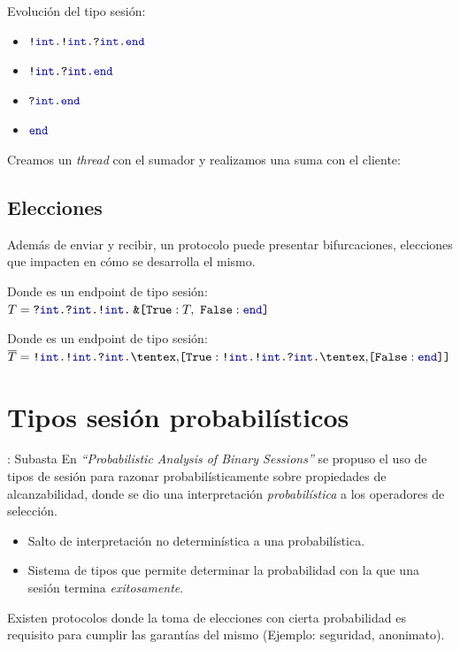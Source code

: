 \begin{frame}{\insertsubsection}
	\SumClient
	Evolución del tipo sesión:
	\begin{itemize}
		\item {} $\Out\tint{ \Out\tint{ \In\tint\End } }$
		\item {} $\Out\tint{ \In\tint\End }$
		\item {} $\In\tint\End$
		\item {} $\End$
	\end{itemize}
\end{frame}

\begin{frame}{\insertsubsection}
	\SumServer
	Creamos un \emph{thread} con el sumador y realizamos una suma con el cliente:
	\SumExample
\end{frame}

\subsection{Elecciones}

\begin{frame}{\insertsubsection}
	Además de enviar y recibir, un protocolo puede presentar bifurcaciones,
	elecciones que impacten en cómo se desarrolla el mismo.

	\SumServerRec

	Donde  es un endpoint de tipo sesión: $\SessionType = \In\tint{ \In\tint{
		\Out\tint\BinaryPBranch[]\T\End } }$
\end{frame}

\begin{frame}{\insertsubsection}
	\SumThreeNumClient
	Donde  es un endpoint de tipo sesión: $\dual\SessionType = \Out\tint{ \Out\tint{
		\In\tint{\Choice\set{\Tag[True]: \Out\tint{ \Out\tint{
		\In\tint{\Choice\set{\Tag[False]: \End} }}}} }}}$
\end{frame}

\section{Tipos sesión probabilísticos}

\begin{frame}{\insertsection: Subasta}
	En \emph{``Probabilistic Analysis of Binary Sessions''} se propuso el uso de tipos de sesión
	para razonar probabilísticamente sobre propiedades de alcanzabilidad,
	donde se dio una interpretación \emph{probabilística} a los operadores
	de selección.

	\begin{itemize}
		\item Salto de interpretación no determinística a una
		probabilística.
		\item Sistema de tipos que permite determinar la probabilidad con la que una
			sesión termina \emph{exitosamente}.
	\end{itemize}

	Existen protocolos donde la toma de elecciones con cierta probabilidad
	es requisito para cumplir las garantías del mismo (Ejemplo: seguridad, anonimato).
\end{frame}

